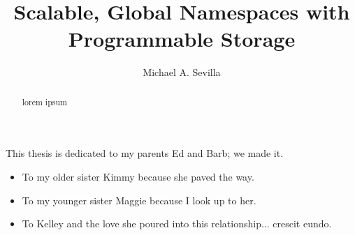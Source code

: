 \title{Scalable, Global Namespaces with Programmable Storage}
\author{Michael A. Sevilla}
\deanlinethree{}

\begin{frontmatter}
	\maketitle\copyrightpage\tableofcontents\listoffigures\listoftables
	\begin{abstract}
	  lorem ipsum
	\end{abstract}

\vspace*{\fill}
\noindent This thesis is dedicated to my parents Ed and Barb; we made it.
\begin{itemize}
  \item[] To my older sister Kimmy because she paved the way.
  \item[] To my younger sister Maggie because I look up to her.
  \item[] To Kelley and the love she poured into this relationship... crescit eundo.
\end{itemize}
\vspace*{\fill}
  
\end{frontmatter}
